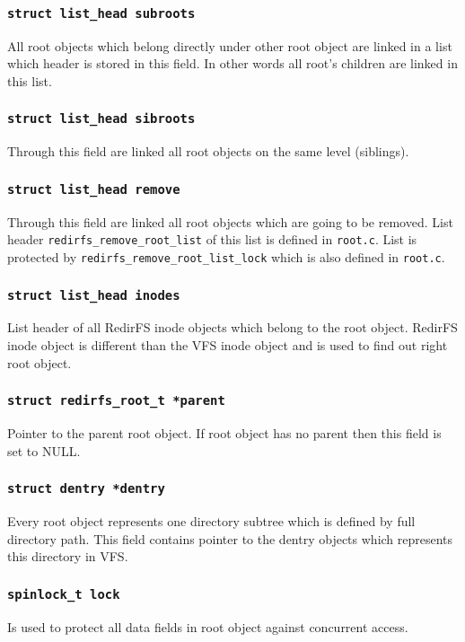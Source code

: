 \subsubsection{\texttt{struct list\_head subroots}}
All root objects which belong directly under other root object are linked in a list
which header is stored in this field. In other words all root's children are linked
in this list.

\subsubsection{\texttt{struct list\_head sibroots}}
Through this field are linked all root objects on the same level (siblings).

\subsubsection{\texttt{struct list\_head remove}}
Through this field are linked all root objects which are going to be removed. List
header \texttt{redirfs\_remove\_root\_list} of this list is defined in
\texttt{root.c}. List is protected by \texttt{redirfs\_remove\_root\_list\_lock} which
is also defined in \texttt{root.c}.

\subsubsection{\texttt{struct list\_head inodes}}
List header of all RedirFS inode objects which belong to the root object. RedirFS inode
object is different than the VFS inode object and is used to find out right root object.

\subsubsection{\texttt{struct redirfs\_root\_t *parent}}
Pointer to the parent root object. If root object has no parent then this field is set
to NULL.

\subsubsection{\texttt{struct dentry *dentry}}
Every root object represents one directory subtree which is defined by full directory
path. This field contains pointer to the dentry objects which represents this
directory in VFS.

\subsubsection{\texttt{spinlock\_t lock}}
Is used to protect all data fields in root object against concurrent access.

